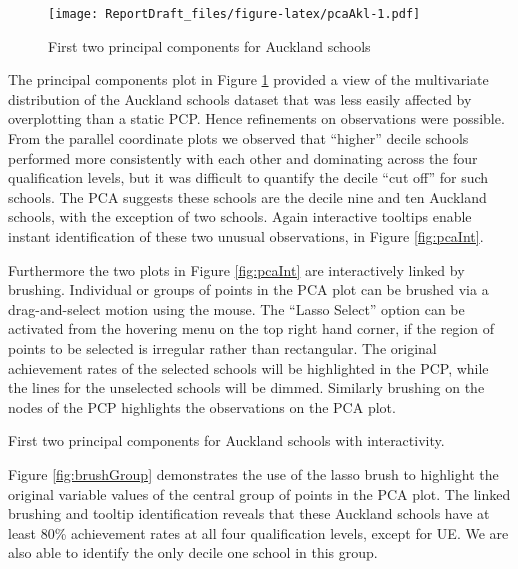 \documentclass[]{book}
\theoremstyle{definition}
\theoremstyle{definition}
\theoremstyle{definition}
\theoremstyle{remark}
\begin{document}
\begin{figure}[htbp]
\centering
\texttt{[image: ReportDraft\_files/figure-latex/pcaAkl-1.pdf]}
\caption{\label{fig:pcaAkl}First two principal components for Auckland
schools}
\end{figure}

The principal components plot in Figure \ref{fig:pcaAkl} provided a view
of the multivariate distribution of the Auckland schools dataset that
was less easily affected by overplotting than a static PCP. Hence
refinements on observations were possible. From the parallel coordinate
plots we observed that ``higher'' decile schools performed more
consistently with each other and dominating across the four
qualification levels, but it was difficult to quantify the decile ``cut
off'' for such schools. The PCA suggests these schools are the decile
nine and ten Auckland schools, with the exception of two schools. Again
interactive tooltips enable instant identification of these two unusual
observations, in Figure \ref{fig:pcaInt}.

Furthermore the two plots in Figure \ref{fig:pcaInt} are interactively
linked by brushing. Individual or groups of points in the PCA plot can
be brushed via a drag-and-select motion using the mouse. The ``Lasso
Select'' option can be activated from the hovering menu on the top right
hand corner, if the region of points to be selected is irregular rather
than rectangular. The original achievement rates of the selected schools
will be highlighted in the PCP, while the lines for the unselected
schools will be dimmed. Similarly brushing on the nodes of the PCP
highlights the observations on the PCA plot.

\hypertarget{4e0727f1afe2}{}

\hypertarget{4e074e33cbe5}{}

\label{fig:pcaInt}First two principal components for Auckland schools with
interactivity.

Figure \ref{fig:brushGroup} demonstrates the use of the lasso brush to
highlight the original variable values of the central group of points in
the PCA plot. The linked brushing and tooltip identification reveals
that these Auckland schools have at least 80\% achievement rates at all
four qualification levels, except for UE. We are also able to identify
the only decile one school in this group.
\end{document}
